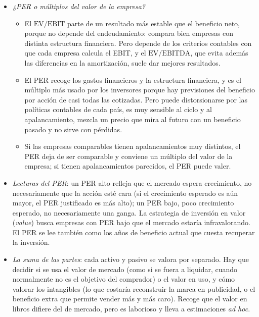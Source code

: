 \documentclass[11pt]{article}
\begin{document}
\begin{itemize}
\item \emph{¿PER o múltiplos del valor de la empresa?}
  \begin{itemize}
  \item El $\mathrm{EV}/\mathrm{EBIT}$ parte de un resultado más estable que el beneficio neto, porque no depende del endeudamiento: compara bien empresas con distinta estructura financiera. Pero depende de los criterios contables con que cada empresa calcula el EBIT, y el $\mathrm{EV}/\mathrm{EBITDA}$, que evita además las diferencias en la amortización, suele dar mejores resultados.
  \item El PER recoge los gastos financieros y la estructura financiera, y es el múltiplo más usado por los inversores porque hay previsiones del beneficio por acción de casi todas las cotizadas. Pero puede distorsionarse por las políticas contables de cada país, es muy sensible al ciclo y al apalancamiento, mezcla un precio que mira al futuro con un beneficio pasado y no sirve con pérdidas.
  \item Si las empresas comparables tienen apalancamientos muy distintos, el PER deja de ser comparable y conviene un múltiplo del valor de la empresa; si tienen apalancamientos parecidos, el PER puede valer.
  \end{itemize}
\item \emph{Lecturas del PER}: un PER alto refleja que el mercado espera crecimiento, no necesariamente que la acción esté cara (si el crecimiento esperado es aún mayor, el PER justificado es más alto); un PER bajo, poco crecimiento esperado, no necesariamente una ganga. La estrategia de inversión en valor (\emph{value}) busca empresas con PER bajo que el mercado estaría infravalorando. El PER se lee también como los años de beneficio actual que cuesta recuperar la inversión.
\item \emph{La suma de las partes}: cada activo y pasivo se valora por separado. Hay que decidir si se usa el valor de mercado (como si se fuera a liquidar, cuando normalmente no es el objetivo del comprador) o el valor en uso, y cómo valorar los intangibles (lo que costaría reconstruir la marca en publicidad, o el beneficio extra que permite vender más y más caro). Recoge que el valor en libros difiere del de mercado, pero es laborioso y lleva a estimaciones \emph{ad hoc}.
\end{itemize}
\end{document}
